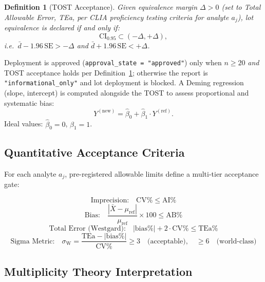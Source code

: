 \documentclass[11pt,a4paper]{article}
\newtheorem{definition}{Definition}[section]
\begin{document}
\begin{definition}[TOST Acceptance]
\label{def:tost}
Given equivalence margin $\Delta > 0$ (set to Total Allowable Error, TEa, per
CLIA proficiency testing criteria for analyte $a_j$), lot equivalence is
declared if and only if:
\[
  \mathrm{CI}_{0.95} \subset (-\Delta, +\Delta),
\]
i.e.\ $\bar{d} - 1.96\,\mathrm{SE} > -\Delta$ \emph{and}
      $\bar{d} + 1.96\,\mathrm{SE} < +\Delta$.
\end{definition}

Deployment is approved (\texttt{approval\_state = "approved"}) only when
$n \ge 20$ \emph{and} TOST acceptance holds per Definition~\ref{def:tost};
otherwise the report is \texttt{"informational\_only"} and lot deployment is
blocked. A Deming regression (slope, intercept) is computed alongside the
TOST to assess proportional and systematic bias:
\[
  Y^{(\mathrm{new})} = \hat{\beta}_0 + \hat{\beta}_1 \cdot Y^{(\mathrm{ref})}.
\]
Ideal values: $\hat{\beta}_0 = 0$, $\hat{\beta}_1 = 1$.

\subsection{Quantitative Acceptance Criteria}
\label{sec:acceptance}

For each analyte $a_j$, pre-registered allowable limits define a
multi-tier acceptance gate:

\[
  \text{Imprecision:} \quad \mathrm{CV\%} \le \mathrm{AI\%}
\]
\[
  \text{Bias:} \quad \frac{|\bar{X} - \mu_{\mathrm{ref}}|}{\mu_{\mathrm{ref}}}
                    \times 100 \le \mathrm{AB\%}
\]
\[
  \text{Total Error (Westgard):} \quad |\text{bias\%}| + 2 \cdot \mathrm{CV\%} \le \mathrm{TEa\%}
\]
\[
  \text{Sigma Metric:} \quad \sigma_{\mathrm{W}} =
  \frac{\mathrm{TEa} - |\text{bias\%}|}{\mathrm{CV\%}} \ge 3
  \quad\text{(acceptable)}, \quad \ge 6 \quad\text{(world-class)}
\]

\subsection{Multiplicity Theory Interpretation}
\label{sec:mult_theory}
\end{document}
